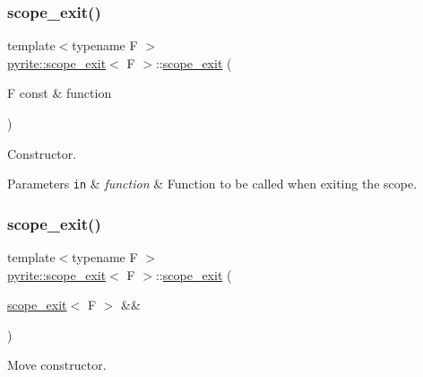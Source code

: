 \subsubsection{\texorpdfstring{scope\+\_\+exit()}{scope\_exit()}\hspace{0.1cm}{\footnotesize\ttfamily [1/2]}}
{\footnotesize\ttfamily template$<$typename F $>$ \\
\mbox{\hyperlink{classpyrite_1_1scope__exit}{pyrite\+::scope\+\_\+exit}}$<$ F $>$\+::\mbox{\hyperlink{classpyrite_1_1scope__exit}{scope\+\_\+exit}} (\begin{DoxyParamCaption}\item[{F const \&}]{function }\end{DoxyParamCaption})\hspace{0.3cm}{\ttfamily [inline]}}

Constructor.


\begin{DoxyParams}[1]{Parameters}
\mbox{\tt in}  & {\em function} & Function to be called when exiting the scope. \\
\hline
\end{DoxyParams}
\mbox{\label{classpyrite_1_1scope__exit_a35cb6b81607b2ea3ca006a387c3d669f}} 
\subsubsection{\texorpdfstring{scope\+\_\+exit()}{scope\_exit()}\hspace{0.1cm}{\footnotesize\ttfamily [2/2]}}
{\footnotesize\ttfamily template$<$typename F $>$ \\
\mbox{\hyperlink{classpyrite_1_1scope__exit}{pyrite\+::scope\+\_\+exit}}$<$ F $>$\+::\mbox{\hyperlink{classpyrite_1_1scope__exit}{scope\+\_\+exit}} (\begin{DoxyParamCaption}\item[{\mbox{\hyperlink{classpyrite_1_1scope__exit}{scope\+\_\+exit}}$<$ F $>$ \&\&}]{ }\end{DoxyParamCaption})\hspace{0.3cm}{\ttfamily [default]}}

Move constructor. \mbox{\label{classpyrite_1_1scope__exit_a724fd7a0fc8fe24fe7ee50f3be68be1f}} 
